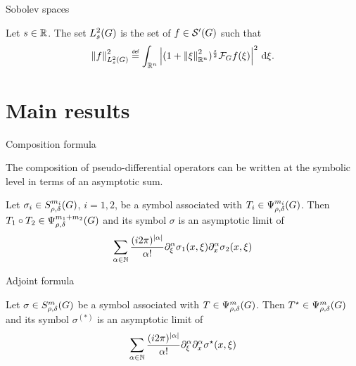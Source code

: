 \documentclass[handout]{beamer}
\begin{document}
\begin{frame}
    {Sobolev spaces}

    \begin{definition}
        Let $s \in \mathbb{R}$.
        The set $L^2_{s}(G)$ is the set of $f \in {\mathcal{S}' (G)}$ such that
        \begin{align*}
            \norm [\Sobolev s] f^2
            \defeq \int_{\R^n} \abs{(1 + \norm [\R^n] \xi^2)^\frac s 2 \Fourier f(\xi)}^2 \dd \xi.
        \end{align*}
    \end{definition}
\end{frame}

\section{Main results}

\begin{frame}
    {Composition formula}

    The composition of pseudo-differential operators can be written at the symbolic level in terms of an asymptotic sum.

    \begin{theorem}

        Let $\sigma_i \in S^{m_i}_{\rho, \delta}(G)$, $i = 1, 2$,
        be a symbol associated with $T_i \in \Psi^{m_i}_{\rho, \delta}(G)$.
        Then $T_1 \circ T_2 \in \Psi^{m_1 + m_2}_{\rho, \delta}(G)$ and its symbol $\sigma$ is an asymptotic limit of
        \begin{align*}
            \sum_{\alpha \in \N} \frac {(\i \turn)^{\abs \alpha}} {\alpha!}
            \iD {\xi^\alpha} \sigma_1(x, \xi)
            \iD {x^\alpha} \sigma_2(x, \xi)
        \end{align*}
    \end{theorem}
\end{frame}

\begin{frame}
    {Adjoint formula}

    \begin{theorem}

        Let $\sigma \in S^{m}_{\rho, \delta}(G)$
        be a symbol associated with $T \in \Psi^{m}_{\rho, \delta}(G)$.
        Then ${T}^\star \in \Psi^{m}_{\rho, \delta}(G)$ and its symbol $\sigma^{(*)}$ is an asymptotic limit of
        \begin{align*}
            \sum_{\alpha \in \N} \frac {(\i \turn)^{\abs \alpha}} {\alpha!}
            \iD {\xi^\alpha} \iD {x^\alpha} \adj \sigma(x, \xi)
        \end{align*}
    \end{theorem}
\end{frame}
\end{document}
